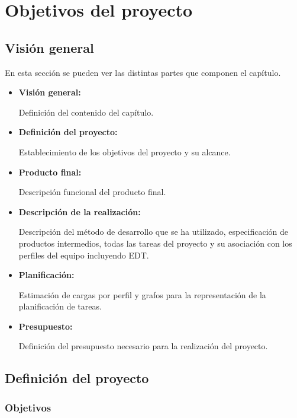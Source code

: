 \chapter{Objetivos del proyecto}

	\section{Visión general}

		En esta sección se pueden ver las distintas partes que componen el capítulo.

		\begin{itemize}
			\item \textbf{Visión general:}
				
			Definición del contenido del capítulo.
			
			\item \textbf{Definición del proyecto:}
				
			Establecimiento de los objetivos del proyecto y su alcance.

			\item \textbf{Producto final:}
				
			Descripción funcional del producto final.

			\item \textbf{Descripción de la realización:}
				
			Descripción del método de desarrollo que se ha utilizado, especificación de productos intermedios, todas las tareas del proyecto y su asociación con los perfiles del equipo incluyendo EDT.

			\item \textbf{Planificación:}
				
			Estimación de cargas por perfil y grafos para la representación de la planificación de tareas.

			\item \textbf{Presupuesto:}
				
			Definición del presupuesto necesario para la realización del proyecto.
		\end{itemize}

	\section{Definición del proyecto}

		\subsection{Objetivos}

